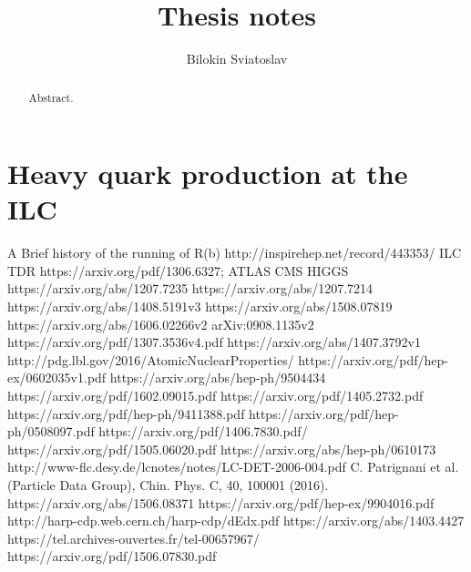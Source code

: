 \documentclass[a4paper]{article}
\title{Thesis notes}
\author{Bilokin Sviatoslav}
\begin{document}
\maketitle
\begin{abstract}
Abstract.
\end{abstract}
\tableofcontents
\linenumbers
%
%
%
%
\newpage
\part{Heavy quark production at the ILC}


% 
\begin{thebibliography}{100} 
 A Brief history of the running of R(b) http://inspirehep.net/record/443353/
 ILC TDR https://arxiv.org/pdf/1306.6327;
 ATLAS CMS HIGGS 
https://arxiv.org/abs/1207.7235
 https://arxiv.org/abs/1207.7214
  https://arxiv.org/abs/1408.5191v3
 https://arxiv.org/abs/1508.07819
 https://arxiv.org/abs/1606.02266v2
  arXiv:0908.1135v2
 https://arxiv.org/pdf/1307.3536v4.pdf
 https://arxiv.org/abs/1407.3792v1
 http://pdg.lbl.gov/2016/AtomicNuclearProperties/
 https://arxiv.org/pdf/hep-ex/0602035v1.pdf
 https://arxiv.org/abs/hep-ph/9504434
 https://arxiv.org/pdf/1602.09015.pdf
 https://arxiv.org/pdf/1405.2732.pdf
 https://arxiv.org/pdf/hep-ph/9411388.pdf
https://arxiv.org/pdf/hep-ph/0508097.pdf
 https://arxiv.org/pdf/1406.7830.pdf/
https://arxiv.org/pdf/1505.06020.pdf
https://arxiv.org/abs/hep-ph/0610173
http://www-flc.desy.de/lcnotes/notes/LC-DET-2006-004.pdf
C. Patrignani et al. (Particle Data Group), Chin. Phys. C, 40, 100001 (2016).
 https://arxiv.org/abs/1506.08371
 https://arxiv.org/pdf/hep-ex/9904016.pdf
 http://harp-cdp.web.cern.ch/harp-cdp/dEdx.pdf
 https://arxiv.org/abs/1403.4427
 https://tel.archives-ouvertes.fr/tel-00657967/
https://arxiv.org/pdf/1506.07830.pdf
\end{thebibliography}
\end{document}
